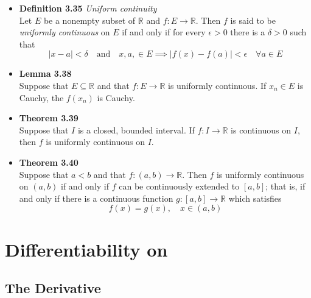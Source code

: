\documentclass[11pt,a4paper]{article}
\begin{document}
\begin{itemize}
    \item \textbf{Definition 3.35} \emph{Uniform continuity} \\
        Let $E$ be a nonempty subset of $\mathbb{R}$ and $f : E \to \mathbb{R}$.
        Then $f$ is said to be \emph{uniformly continuous} on $E$ if and only if
        for every $\epsilon > 0$ there is a $\delta > 0$ such that
        \[
            |x-a| < \delta \quad \text{and} \quad x, a, \in E \implies |f(x) - f(a)| < \epsilon \quad \forall a \in E
        \]

    \item \textbf{Lemma 3.38} \\
        Suppose that $E \subseteq \mathbb{R}$ and that $f : E \to \mathbb{R}$
        is uniformly continuous.
        If $x_n \in E$ is Cauchy, the $f(x_n)$ is Cauchy.

    \item \textbf{Theorem 3.39} \\
        Suppose that $I$ is a closed, bounded interval.
        If $f : I \to \mathbb{R}$ is continuous on $I$, then $f$ is uniformly continuous on
        $I$.

    \item \textbf{Theorem 3.40} \\
        Suppose that $a < b$ and that $f : (a, b) \to \mathbb{R}$.
        Then $f$ is uniformly continuous on $(a, b)$ if and only if $f$ can be continuously
        extended to $[a, b]$; that is, if and only if there is a continuous function
        $g : [a, b] \to \mathbb{R}$ which satisfies
        \[
            f(x) = g(x), \quad x \in (a, b)
        \]
\end{itemize}

\break{}

\section{Differentiability on }

\subsection{The Derivative}
\end{document}
